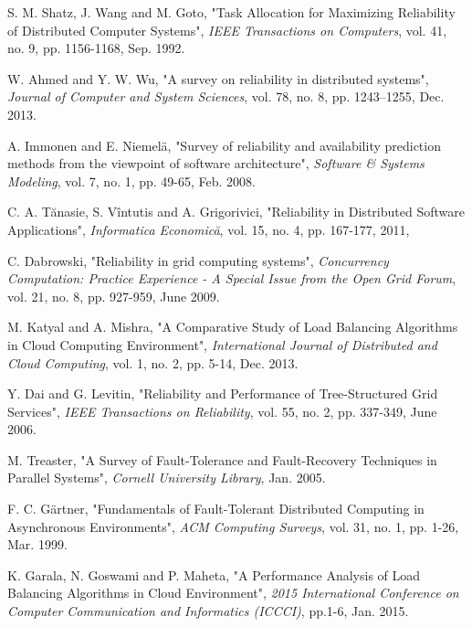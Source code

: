 \documentclass{cslthse-msc}
\begin{document}
\begin{thebibliography}{50}


	S. M. Shatz, J. Wang and M. Goto,
	"Task Allocation for Maximizing Reliability of Distributed Computer Systems",
	\emph{IEEE Transactions on Computers}, vol. 41, no. 9, pp. 1156-1168, Sep. 1992.
	
	W. Ahmed and Y. W. Wu,
	"A survey on reliability in distributed systems",
	\emph{Journal of Computer and System Sciences}, vol. 78, no. 8,	pp. 1243–1255, Dec. 2013.
	
	A. Immonen and E. Niemelä,
	"Survey of reliability and availability prediction methods from the viewpoint of software architecture",
	\emph{Software \& Systems Modeling}, vol. 7, no. 1, pp. 49-65, Feb. 2008.

	C. A. Tănasie, S. Vîntutis and A. Grigorivici,
	"Reliability in Distributed Software Applications",
	\emph{Informatica Economică}, vol. 15, no. 4, pp. 167-177, 2011,

	C. Dabrowski,
	"Reliability in grid computing systems",
	\emph{Concurrency Computation: Practice Experience  - A Special Issue from the Open Grid Forum}, vol. 21, no. 8, pp. 927-959, June 2009.

	M. Katyal and A. Mishra,
	"A Comparative Study of Load Balancing Algorithms in Cloud Computing Environment",
	\emph{International Journal of Distributed and Cloud Computing}, vol. 1, no. 2, pp. 5-14, Dec. 2013.
	
	Y. Dai and G. Levitin,
	"Reliability and Performance of Tree-Structured Grid Services",
	\emph{IEEE Transactions on Reliability}, vol. 55, no. 2, pp. 337-349, June 2006.

	M. Treaster,
	"A Survey of Fault-Tolerance and Fault-Recovery Techniques in Parallel Systems",
	\emph{Cornell University Library}, Jan. 2005.

	F. C. Gärtner,
	"Fundamentals of Fault-Tolerant Distributed Computing in Asynchronous Environments",
	\emph{ACM Computing Surveys}, vol. 31, no. 1, pp. 1-26, Mar. 1999.

	K. Garala, N. Goswami and P. Maheta,
	"A Performance Analysis of Load Balancing Algorithms in Cloud Environment",
	\emph{2015 International Conference on Computer Communication and Informatics (ICCCI)}, pp.1-6, Jan. 2015.
	

\end{thebibliography}
\end{document}
